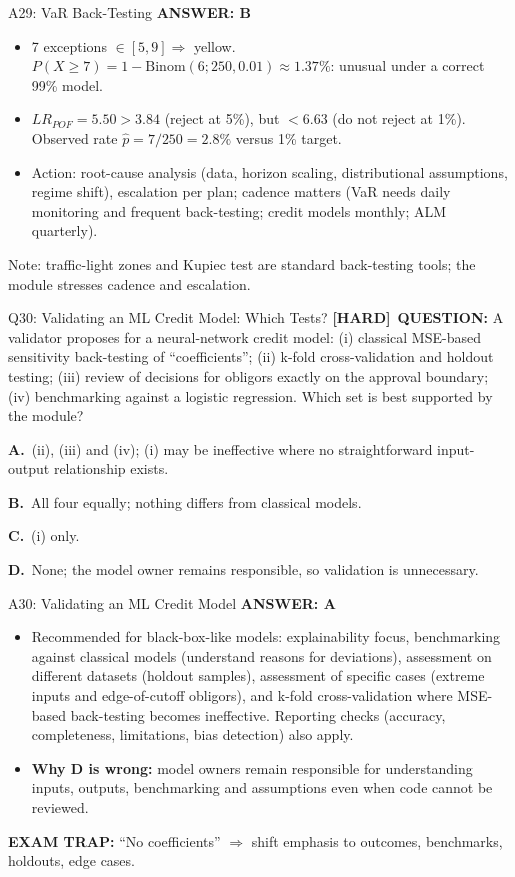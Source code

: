 \documentclass[8pt]{beamer}
\newcommand{\fs}{\fontsize{10}{12}\selectfont}
\newcommand{\opts}[4]{\par\vspace{0.12cm}\noindent\textbf{A.}~#1\par\vspace{0.08cm}\noindent\textbf{B.}~#2\par\vspace{0.08cm}\noindent\textbf{C.}~#3\par\vspace{0.08cm}\noindent\textbf{D.}~#4\par}
\newcommand{\ans}[1]{\textcolor{myblue}{\textbf{ANSWER: #1}}}
\newcommand{\trap}[1]{\textcolor{myred}{\textbf{EXAM TRAP:}} #1}
\newcommand{\hard}{\textcolor{myorange}{\textbf{[HARD]}}}
\begin{document}
\begin{frame}[t]{A29: VaR Back-Testing}
\fs
\ans{B}
\begin{itemize}
\item 7 exceptions $\in[5,9]\Rightarrow$ yellow. $P(X\ge7)=1-\text{Binom}(6;250,0.01)\approx1.37\%$: unusual under a correct 99\% model.
\item $LR_{POF}=5.50>3.84$ (reject at 5\%), but $<6.63$ (do not reject at 1\%). Observed rate $\hat p=7/250=2.8\%$ versus 1\% target.
\item Action: root-cause analysis (data, horizon scaling, distributional assumptions, regime shift), escalation per plan; cadence matters (VaR needs daily monitoring and frequent back-testing; credit models monthly; ALM quarterly).
\end{itemize}
\textcolor{mygray}{Note: traffic-light zones and Kupiec test are standard back-testing tools; the module stresses cadence and escalation.}
\end{frame}

\begin{frame}[t]{Q30: Validating an ML Credit Model: Which Tests?}
\fs
\hard\ \textbf{QUESTION:} A validator proposes for a neural-network credit model: (i) classical MSE-based sensitivity back-testing of ``coefficients''; (ii) k-fold cross-validation and holdout testing; (iii) review of decisions for obligors exactly on the approval boundary; (iv) benchmarking against a logistic regression. Which set is best supported by the module?
\opts{(ii), (iii) and (iv); (i) may be ineffective where no straightforward input-output relationship exists.}
{All four equally; nothing differs from classical models.}
{(i) only.}
{None; the model owner remains responsible, so validation is unnecessary.}
\end{frame}

\begin{frame}[t]{A30: Validating an ML Credit Model}
\fs
\ans{A}
\begin{itemize}
\item Recommended for black-box-like models: explainability focus, benchmarking against classical models (understand reasons for deviations), assessment on different datasets (holdout samples), assessment of specific cases (extreme inputs and edge-of-cutoff obligors), and k-fold cross-validation where MSE-based back-testing becomes ineffective. Reporting checks (accuracy, completeness, limitations, bias detection) also apply.
\item \textbf{Why D is wrong:} model owners remain responsible for understanding inputs, outputs, benchmarking and assumptions even when code cannot be reviewed.
\end{itemize}
\trap{``No coefficients'' $\Rightarrow$ shift emphasis to \textcolor{myblue}{outcomes, benchmarks, holdouts, edge cases}.}
\end{frame}
\end{document}
